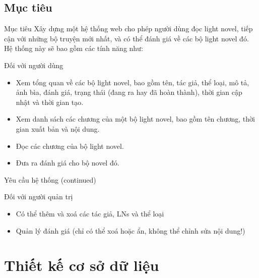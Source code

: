 \documentclass[12pt,aspectratio=169,handout]{beamer}
\begin{document}
\subsection{Mục tiêu}
\begin{frame}{Mục tiêu}
    Xây dựng một hệ thống web cho phép người dùng đọc light novel, tiếp cận với những bộ truyện mới nhất, và có thể đánh giá về các bộ light novel đó. Hệ thống này sẽ bao gồm các tính năng như:
    \begin{block}{Đối với người dùng}
        \begin{itemize}
            \item Xem tổng quan về các bộ light novel, bao gồm tên, tác giả, thể loại, mô tả, ảnh bìa, đánh giá, trạng thái (đang ra hay đã hoàn thành), thời gian cập nhật và thời gian tạo.
            \item Xem danh sách các chương của một bộ light novel, bao gồm tên chương, thời gian xuất bản và nội dung.
            \item Đọc các chương của bộ light novel.
            \item Đưa ra đánh giá cho bộ novel đó.
        \end{itemize}
    \end{block}
\end{frame}

\begin{frame}{Yêu cầu hệ thống (continued)}
    \begin{block}{Đối với người quản trị}
        \begin{itemize}
            \item Có thể thêm và xoá các tác giả, LNs và thể loại
            \item Quản lý đánh giá (chỉ có thể xoá hoặc ẩn, không thể chỉnh sửa nội dung!)
        \end{itemize}
    \end{block}
\end{frame}


\section{Thiết kế cơ sở dữ liệu}
\end{document}
